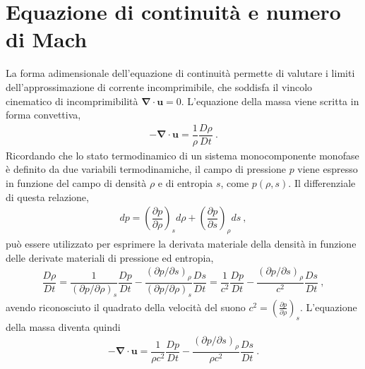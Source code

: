 \documentclass[letterpaper,10pt,italian]{jupyterBook}
\begin{document}
\section{Equazione di continuità e numero di Mach}
\label{\detokenize{polimi/fluidmechanics-ita/template/capitoli/07_similitudine/07teoria:equazione-di-continuita-e-numero-di-mach}}
\sphinxAtStartPar
La forma adimensionale dell’equazione di continuità permette di valutare
i limiti dell’approssimazione di corrente incomprimibile, che soddisfa
il vincolo cinematico di incomprimibilità
\(\mathbf{\nabla} \cdot \mathbf{u} = 0\). L’equazione della massa viene scritta in
forma convettiva,
\begin{equation*}
\begin{split}- \mathbf{\nabla} \cdot \mathbf{u} = \dfrac{1}{\rho}\dfrac{D \rho}{D t} \ .\end{split}
\end{equation*}
\sphinxAtStartPar
Ricordando che lo stato termodinamico di un sistema monocomponente
monofase è definito da due variabili termodinamiche, il campo di
pressione \(p\) viene espresso in funzione del campo di densità \(\rho\) e
di entropia \(s\), come \(p(\rho,s)\). Il differenziale di questa relazione,
\begin{equation*}
\begin{split}d p = \left(\dfrac{\partial p}{\partial \rho}\right)_s d \rho +
       \left(\dfrac{\partial p}{\partial s}\right)_{\rho} d s \ ,\end{split}
\end{equation*}
\sphinxAtStartPar
può
essere utilizzato per esprimere la derivata materiale della densità in
funzione delle derivate materiali di pressione ed entropia,
\begin{equation*}
\begin{split}\dfrac{D \rho}{D t} = \dfrac{1}{\left(\partial p/\partial \rho\right)_s}\dfrac{D p}{D t} - \dfrac{\left(\partial p/\partial s\right)_{\rho}}{\left(\partial p/\partial \rho\right)_s}\dfrac{D s}{D t} = \dfrac{1}{c^2}\dfrac{D p}{D t} - \dfrac{\left(\partial p/\partial s\right)_{\rho}}{c^2}\dfrac{D s}{D t} \ ,\end{split}
\end{equation*}
\sphinxAtStartPar
avendo riconosciuto il quadrato della velocità del suono
\(c^2 = \left(\frac{\partial p}{\partial \rho}\right)_s\). L’equazione
della massa diventa quindi
\begin{equation*}
\begin{split}- \mathbf{\nabla} \cdot \mathbf{u} = \dfrac{1}{\rho c^2}\dfrac{D p}{D t} - \dfrac{\left(\partial p/\partial s\right)_{\rho}}{\rho c^2}\dfrac{D s}{D t} \ .\end{split}
\end{equation*}
\end{document}
